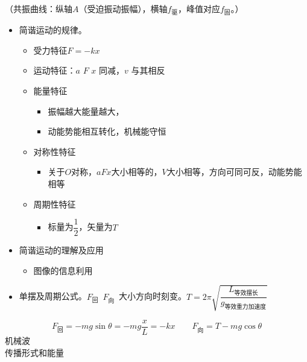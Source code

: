 （共振曲线：纵轴$A$（受迫振动振幅），横轴$f_{\text{驱}}$，峰值对应$f_{\text{固}}$。）
\begin{itemize}
\item 简谐运动的规律。
  \begin{itemize}
  \item 受力特征\quad $F=-kx$
  \item 运动特征：$a$ $F$ $x$ 同减，$v$ 与其相反
  \item 能量特征
    \begin{itemize}
    \item 振幅越大能量越大，
    \item 动能势能相互转化，机械能守恒
    \end{itemize}
  \item 对称性特征
    \begin{itemize}
    \item 关于$O$对称，$aFx$大小相等的，$V$大小相等，方向可同可反，动能势能相等
    \end{itemize}
  \item 周期性特征
    \begin{itemize}
    \item 标量为$\dfrac{1}{2}$，矢量为$T$
    \end{itemize}
  \end{itemize}
\item 简谐运动的理解及应用
  \begin{itemize}
  \item 图像的信息利用
  \end{itemize}
\end{itemize}
\begin{itemize}
\item 单摆及周期公式。\quad $F_{\text{回}}$\ $F_{\text{向}}$\ 大小方向时刻变。\quad $T=2\pi\sqrt{\dfrac{L_{\text{等效摆长}}}{g_{\text{等效重力加速度}}}}$
\end{itemize}
\[ F_{\text{回}}=-mg\sin\theta=-mg\frac{x}{L}=-kx\qquad F_{\text{向}}=T-mg\cos\theta \]
机械波\\
传播形式和能量\\
